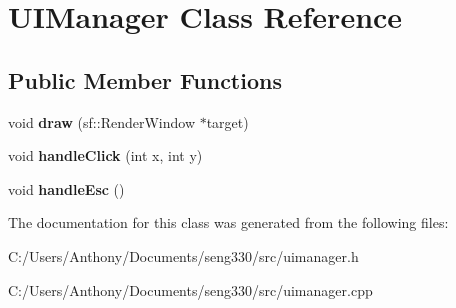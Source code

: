 \hypertarget{class_u_i_manager}{}\section{U\+I\+Manager Class Reference}
\label{class_u_i_manager}
\subsection*{Public Member Functions}
\begin{DoxyCompactItemize}
\item 
\hypertarget{class_u_i_manager_a93440991c435364a9f5b45af839255cb}{}void {\bfseries draw} (sf\+::\+Render\+Window $\ast$target)\label{class_u_i_manager_a93440991c435364a9f5b45af839255cb}

\item 
\hypertarget{class_u_i_manager_a847b80aeee2eac2ab2680b0346b33ef1}{}void {\bfseries handle\+Click} (int x, int y)\label{class_u_i_manager_a847b80aeee2eac2ab2680b0346b33ef1}

\item 
\hypertarget{class_u_i_manager_a247345c268729bc04b5d903a94ccdeaf}{}void {\bfseries handle\+Esc} ()\label{class_u_i_manager_a247345c268729bc04b5d903a94ccdeaf}

\end{DoxyCompactItemize}


The documentation for this class was generated from the following files\+:\begin{DoxyCompactItemize}
\item 
C\+:/\+Users/\+Anthony/\+Documents/seng330/src/uimanager.\+h\item 
C\+:/\+Users/\+Anthony/\+Documents/seng330/src/uimanager.\+cpp\end{DoxyCompactItemize}
